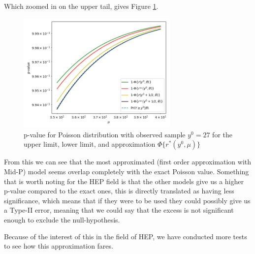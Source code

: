 \documentclass[14pt, a4paper]{article}  %
\begin{document}
Which zoomed in on the upper tail, gives Figure \ref{fig:book_sf_fr_zoom}. \clearpage
\begin{figure}[!ht]
	\centering
        \includegraphics[width=0.7\textwidth]{Book_examples_further/book_sig_zoom.png}
	\caption{p-value for Poisson distribution with observed sample $y^0=27$ for the upper limit, lower limit, and approximation $\Phi\{r^*(y^0,\mu)\}$}\label{fig:book_sf_fr_zoom}
\end{figure} 
\noindent From this we can see that the most approximated (first order approximation with Mid-P) model seems overlap completely with the exact Poisson value. Something that is worth noting for the HEP field is that the other models give us a higher p-value compared to the exact ones, this is directly translated as having less significance, which means that if they were to be used they could possibly give us a Type-II error, meaning that we could say that the excess is not significant enough to exclude the null-hypothesis. 

Because of the interest of this in  the field of HEP, we have conducted more tests to see how this approximation fares.
\end{document}
